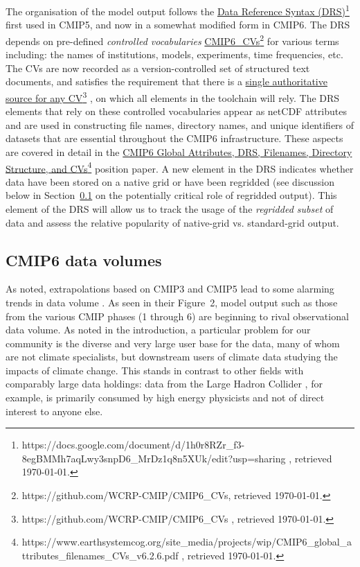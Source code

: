 \documentclass[gmd,manuscript]{copernicus}
\begin{document}
The organisation of the model output follows the
\href{https://docs.google.com/document/d/1h0r8RZr_f3-8egBMMh7aqLwy3snpD6_MrDz1q8n5XUk/edit?usp=sharing
}{Data Reference Syntax
  (DRS)}\footnote{https://docs.google.com/document/d/1h0r8RZr\_f3-8egBMMh7aqLwy3snpD6\_MrDz1q8n5XUk/edit?usp=sharing
  , retrieved \today.} first used in CMIP5, and now in a somewhat
modified form in CMIP6. The DRS depends on pre-defined
\emph{controlled vocabularies}
\href{https://github.com/WCRP-CMIP/CMIP6_CVs}{CMIP6\_CVs}\footnote{https://github.com/WCRP-CMIP/CMIP6\_CVs,
  retrieved \today.} for various terms including: the names of
institutions, models, experiments, time frequencies, etc. The CVs are
now recorded as a version-controlled set of structured text documents,
and satisfies the requirement that there is a
\href{https://github.com/WCRP-CMIP/CMIP6_CVs }{single authoritative
  source for any CV}\footnote{https://github.com/WCRP-CMIP/CMIP6\_CVs
  , retrieved \today.} , on which all elements in the toolchain will
rely. The DRS elements that rely on these controlled vocabularies
appear as netCDF attributes and are used in constructing file names,
directory names, and unique identifiers of datasets that are essential
throughout the CMIP6 infrastructure. These aspects are covered in
detail in the
\href{https://www.earthsystemcog.org/site_media/projects/wip/CMIP6_global_attributes_filenames_CVs_v6.2.6.pdf
}{CMIP6 Global Attributes, DRS, Filenames, Directory Structure, and
  CVs}\footnote{https://www.earthsystemcog.org/site\_media/projects/wip/CMIP6\_global\_attributes\_filenames\_CVs\_v6.2.6.pdf
  , retrieved \today.} position paper. A new element in the DRS
indicates whether data have been stored on a native grid or have been
regridded (see discussion below in Section~\ref{sec:dvol} on the
potentially critical role of regridded output). This element of the
DRS will allow us to track the usage of the \emph{regridded subset} of
data and assess the relative popularity of native-grid vs.
standard-grid output.

\subsection{CMIP6 data volumes}
\label{sec:dvol}

As noted, extrapolations based on CMIP3 and CMIP5 lead to some
alarming trends in data volume \citep[see
e.g.,][]{ref:overpecketal2011}. As seen in their Figure~2, model
output such as those from the various CMIP phases (1 through 6) are
beginning to rival observational data volume. As noted in the
introduction, a particular problem for our community is the diverse
and very large user base for the data, many of whom are not climate
specialists, but downstream users of climate data studying the impacts
of climate change. This stands in contrast to other fields with
comparably large data holdings: data from the Large Hadron Collider
\citep[e.g.,][]{ref:aadetal2008}, for example, is primarily consumed
by high energy physicists and not of direct interest to anyone else.
\end{document}

